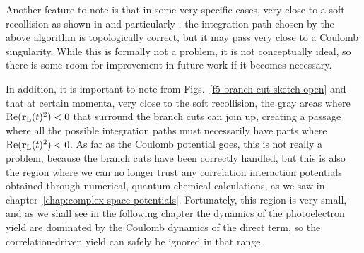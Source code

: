 Another feature to note is that in some very specific cases, very close to a soft recollision as shown in  and particularly , the integration path chosen by the above algorithm is topologically correct, but it may pass very close to a Coulomb singularity. While this is formally not a problem, it is not conceptually ideal, so there is some room for improvement in future work if it becomes necessary.


In addition, it is important to note from Figs.~\ref{f5-branch-cut-sketch-open} and  that at certain momenta, very close to the soft recollision, the gray areas where $\Re(\vb{r}_\mathrm{L}(t)^2)<0$ that surround the branch cuts can join up, creating a passage where all the possible integration paths must necessarily have parts where $\Re(\vb{r}_\mathrm{L}(t)^2)<0$. As far as the Coulomb potential goes, this is not really a problem, because the branch cuts have been correctly handled, but this is also the region where we can no longer trust any correlation interaction potentials obtained through numerical, quantum chemical calculations, as we saw in chapter~\ref{chap:complex-space-potentials}. Fortunately, this region is very small, and as we shall see in the following chapter the dynamics of the photoelectron yield are dominated by the Coulomb dynamics of the direct term, so the correlation-driven yield can safely be ignored in that range.




































   
